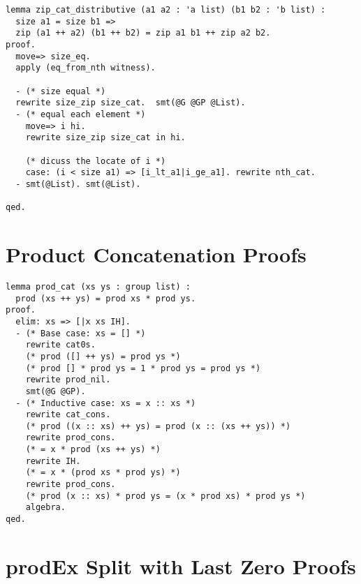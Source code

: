 \begin{lstlisting}[style=easycrypt, caption=Proof of Zip Concatenation Distributivity, breaklines=true, breakatwhitespace=true, frame=single, keepspaces=true]
lemma zip_cat_distributive (a1 a2 : 'a list) (b1 b2 : 'b list) :
  size a1 = size b1 =>
  zip (a1 ++ a2) (b1 ++ b2) = zip a1 b1 ++ zip a2 b2.
proof.
  move=> size_eq.
  apply (eq_from_nth witness).
  
  - (* size equal *)
  rewrite size_zip size_cat.  smt(@G @GP @List).
  - (* equal each element *)
    move=> i hi.
    rewrite size_zip size_cat in hi.
    
    (* dicuss the locate of i *)
    case: (i < size a1) => [i_lt_a1|i_ge_a1]. rewrite nth_cat.
  - smt(@List). smt(@List).

qed.
\end{lstlisting}

\section{Product Concatenation Proofs}
\label{sec:prod-cat-proofs}

\begin{lstlisting}[style=easycrypt, caption=Proof of Product Concatenation, breaklines=true, breakatwhitespace=true, frame=single, keepspaces=true]
lemma prod_cat (xs ys : group list) :
  prod (xs ++ ys) = prod xs * prod ys.
proof.
  elim: xs => [|x xs IH].
  - (* Base case: xs = [] *)
    rewrite cat0s.
    (* prod ([] ++ ys) = prod ys *)
    (* prod [] * prod ys = 1 * prod ys = prod ys *)
    rewrite prod_nil.
    smt(@G @GP).
  - (* Inductive case: xs = x :: xs *)
    rewrite cat_cons.
    (* prod ((x :: xs) ++ ys) = prod (x :: (xs ++ ys)) *)
    rewrite prod_cons.
    (* = x * prod (xs ++ ys) *)
    rewrite IH.
    (* = x * (prod xs * prod ys) *)
    rewrite prod_cons.
    (* prod (x :: xs) * prod ys = (x * prod xs) * prod ys *)
    algebra. 
qed.
\end{lstlisting}

\section{prodEx Split with Last Zero Proofs}
\label{sec:prodex-split-proofs}

